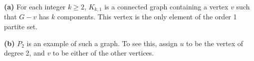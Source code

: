 \documentclass[12pt]{article}
\begin{document}
\newpage{}

    {\bf (a)} For each integer $k \geq 2$, $K_{k,1}$ is a connected graph containing a vertex $v$ such that $G-v$ has $k$ components.
    This vertex is the only element of the order 1 partite set.

    {\bf (b)} $P_2$ is an example of such a graph.
    To see this, assign $u$ to be the vertex of degree 2, and $v$ to be either of the other vertices.

\newpage{}

    
\end{document}
